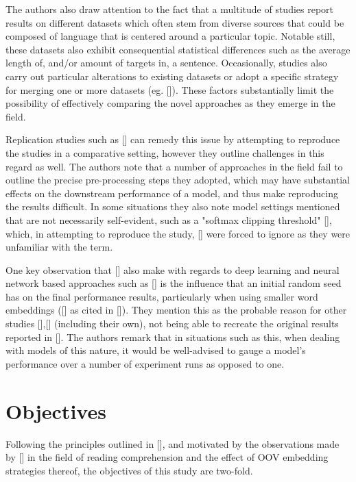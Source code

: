 \documentclass[12pt, a4paper]{report}
\theoremstyle{definition}
\theoremstyle{definition}%
\theoremstyle{definition}%
\theoremstyle{definition}%
\theoremstyle{definition}%
\theoremstyle{definition}%
\renewcommand{\cite}[1]{[\citealp{#1}]}
\begin{document}
The authors also draw attention to the fact that a multitude of studies report results on different datasets which often stem from diverse sources that could be composed of language that is centered around a particular topic. Notable still, these datasets also exhibit consequential statistical differences such as the average length of, and/or amount of targets in, a sentence. Occasionally, studies also carry out particular alterations to existing datasets or adopt a specific strategy for merging one or more datasets (eg. \cite{xue2018}). These factors substantially limit the possibility of effectively comparing the novel approaches as they emerge in the field.

Replication studies such as \cite{moore2018} can remedy this issue by attempting to reproduce the studies in a comparative setting, however they outline challenges in this regard as well. The authors note that a number of approaches in the field fail to outline the precise pre-processing steps they adopted, which may have substantial effects on the downstream performance of a model, and thus make reproducing the results difficult. In some situations they also note model settings mentioned that are not necessarily self-evident, such as a "softmax clipping threshold" \cite{tang2016b}, which, in attempting to reproduce the study, \cite{moore2018} were forced to ignore as they were unfamiliar with the term.

One key observation that \cite{moore2018} also make with regards to deep learning and neural network based approaches such as \cite{tang2016b} is the influence that an initial random seed has on the final performance results, particularly when using smaller word embeddings (\cite{reimers2017} as cited in \cite{moore2018}). They mention this as the probable reason for other studies \cite{chen2017},\cite{tay2017} (including their own), not being able to recreate the original results reported in \cite{tang2016b}. The authors remark that in situations such as this, when dealing with models of this nature, it would be well-advised to gauge a model's performance over a number of experiment runs as opposed to one.

\section{Objectives}
Following the principles outlined in \cite{moore2018}, and motivated by the observations made by \cite{bhuwandhingra2017} in the field of reading comprehension and the effect of OOV embedding strategies thereof, the objectives of this study are two-fold.
\end{document}
